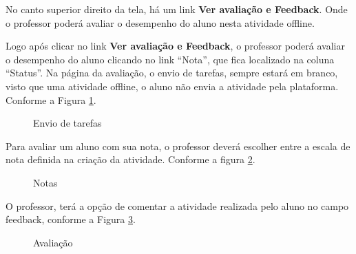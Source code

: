 No canto superior direito da tela, há um link  \textbf{Ver avaliação e Feedback}. Onde o professor poderá avaliar o desempenho do aluno nesta atividade offline.

Logo após clicar no link   \textbf{Ver avaliação e Feedback}, o professor poderá avaliar o desempenho do aluno clicando no link “Nota”, que fica localizado na coluna “Status”.
Na página da avaliação, o envio de tarefas, sempre estará em branco, visto que uma atividade offline, o aluno não envia a atividade pela plataforma. Conforme a Figura \ref{fig:cap5_40}.

\begin{figure}[!htbp]
 \begin{center}
\caption{Envio de tarefas}
  \label{fig:cap5_40}
 \end{center}
\end{figure}
Para avaliar um aluno com sua nota, o professor deverá escolher entre a escala de nota definida na criação da atividade. Conforme a figura  \ref{fig:cap5_41}.

\begin{figure}[!htbp]
 \begin{center}
\caption{Notas}
  \label{fig:cap5_41}
 \end{center}
\end{figure}
O professor, terá a opção de comentar a atividade realizada pelo aluno no campo feedback, conforme a Figura \ref{fig:cap5_42}.

\begin{figure}[!htbp]
 \begin{center}
\caption{Avaliação}
  \label{fig:cap5_42}
 \end{center}
\end{figure}

